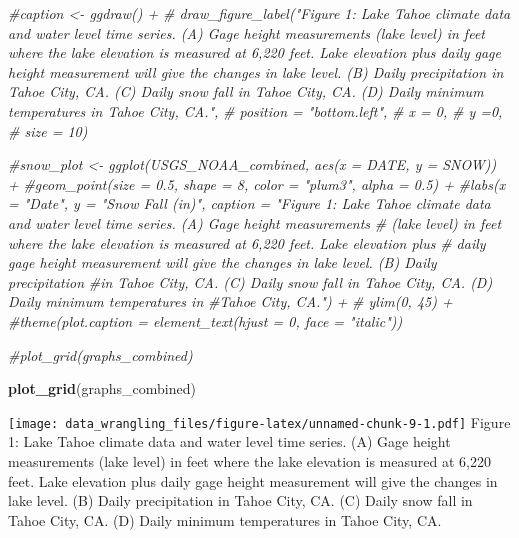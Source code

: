 \documentclass[]{article}
\newenvironment{Shaded}{\begin{snugshade}}{\end{snugshade}}
\newcommand{\CommentTok}[1]{\textcolor[rgb]{0.56,0.35,0.01}{\textit{#1}}}
\newcommand{\KeywordTok}[1]{\textcolor[rgb]{0.13,0.29,0.53}{\textbf{#1}}}
\newcommand{\NormalTok}[1]{#1}
\begin{document}
\begin{Shaded}
\begin{Highlighting}[]
\CommentTok{#caption <- ggdraw() +}
 \CommentTok{# draw_figure_label("Figure 1: Lake Tahoe climate data and water level time series. (A) Gage height measurements (lake level) in feet where the lake elevation is measured at 6,220 feet. Lake elevation plus daily gage height measurement will give the changes in lake level. (B) Daily precipitation in Tahoe City, CA. (C) Daily snow fall in Tahoe City, CA. (D) Daily minimum temperatures in Tahoe City, CA.",}
            \CommentTok{# position = "bottom.left",}
           \CommentTok{#  x = 0,}
            \CommentTok{# y =0,}
            \CommentTok{# size = 10)}

\CommentTok{#snow_plot <- ggplot(USGS_NOAA_combined, aes(x = DATE, y = SNOW)) +}
  \CommentTok{#geom_point(size = 0.5, shape = 8, color = "plum3", alpha = 0.5) +}
  \CommentTok{#labs(x = "Date", y = "Snow Fall (in)", caption = "Figure 1: Lake Tahoe climate data and water level time series. (A) Gage height measurements }
     \CommentTok{#  (lake level) in feet where the lake elevation is measured at 6,220 feet. Lake elevation plus }
      \CommentTok{# daily gage height measurement will give the changes in lake level. (B) Daily precipitation }
       \CommentTok{#in Tahoe City, CA. (C) Daily snow fall in Tahoe City, CA. (D) Daily minimum temperatures in }
       \CommentTok{#Tahoe City, CA.") +}
 \CommentTok{# ylim(0, 45) +}
  \CommentTok{#theme(plot.caption = element_text(hjust = 0, face = "italic"))}

\CommentTok{#plot_grid(graphs_combined)    }
\end{Highlighting}
\end{Shaded}

\begin{Shaded}
\begin{Highlighting}[]
\KeywordTok{plot_grid}\NormalTok{(graphs_combined) }
\end{Highlighting}
\end{Shaded}

\texttt{[image: data\_wrangling\_files/figure-latex/unnamed-chunk-9-1.pdf]}
Figure 1: Lake Tahoe climate data and water level time series. (A) Gage
height measurements (lake level) in feet where the lake elevation is
measured at 6,220 feet. Lake elevation plus daily gage height
measurement will give the changes in lake level. (B) Daily precipitation
in Tahoe City, CA. (C) Daily snow fall in Tahoe City, CA. (D) Daily
minimum temperatures in Tahoe City, CA.
\end{document}

